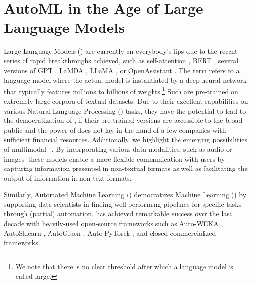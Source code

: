 
\chapter{AutoML in the Age of Large Language Models}
\label{human-centric-chap:llm}

Large Language Models (\LLMs) \cite{zhao-arxiv23a} are currently on everybody's lips due to the recent series of rapid breakthroughs achieved, such as self-attention \cite{vaswani-neurips17a}, BERT \cite{devlin-acl19a}, several versions of GPT \cite{radford-openai18a,radford-openai19a,brown-neurips20a,openai-openai22a,openai-openai23a}, LaMDA \cite{thoppilan-arxiv22a}, LLaMA \cite{touvren-arxiv23a}, or OpenAssistant \cite{koepf-arxiv23a}. The term \LLM refers to a language model where the actual model is instantiated by a deep neural network that typically features millions to billions of weights.\footnote{We note that there is no clear threshold after which a language model is called large.} Such \LLMs are pre-trained on extremely large corpora of textual datasets. Due to their excellent capabilities on various Natural Language Processing (\NLP) tasks, they have the potential to lead to the democratization of \NLP, if their pre-trained versions are accessible to the broad public and the power of \LLMs does not lay in the hand of a few companies with sufficient financial resources. Additionally,  we highlight the emerging possibilities of multimodal \LLMs~\cite{yin-arxiv2023a, wu-arxiv2023a}. By incorporating various data modalities, such as audio or images, these models enable a more flexible communication with users by capturing information presented in non-textual formats as well as facilitating the output of information in non-text formats.

Similarly, Automated Machine Learning (\AutoML) \cite{hutter-book19a} democratizes Machine Learning (\ML) by supporting data scientists in finding well-performing \ML pipelines for specific tasks through (partial) automation. \AutoML has achieved remarkable success over the last decade with heavily-used open-source frameworks such as Auto-WEKA \cite{thornton-kdd13a,kotthoff-automlbook19a}, AutoSklearn \cite{feurer-automlbook19b,feurer-jmlr22a}, AutoGluon \cite{erickson-arxiv20a}, Auto-PyTorch \cite{zimmer-tpami21a}, and closed commercialized frameworks. 

